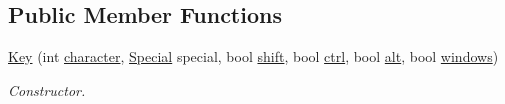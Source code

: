 \subsection*{Public Member Functions}
\begin{DoxyCompactItemize}
\item 
\hypertarget{classGUI_1_1Key_aeb3c2b270052f5a4ebbe229af93a721d}{\hyperlink{classGUI_1_1Key_aeb3c2b270052f5a4ebbe229af93a721d}{Key} (int \hyperlink{classGUI_1_1Key_a08e3432cc2bc3ceded36c3405fca4353}{character}, \hyperlink{classGUI_1_1Key_a9d3f8dbfc08f0189dbb8aa5a20b9ea99}{Special} special, bool \hyperlink{classGUI_1_1Key_a1d5e7cc9901d4a4de7bb735da176aef1}{shift}, bool \hyperlink{classGUI_1_1Key_a1f76abf9d09f4058ab21fde120958ee3}{ctrl}, bool \hyperlink{classGUI_1_1Key_a717d049af03dea6f7fafd58dd3160ebe}{alt}, bool \hyperlink{classGUI_1_1Key_abc017c8f165f2b4c857c757ef413da3c}{windows})}\label{classGUI_1_1Key_aeb3c2b270052f5a4ebbe229af93a721d}

\begin{DoxyCompactList}\small\item\em Constructor. \end{DoxyCompactList}\end{DoxyCompactItemize}
